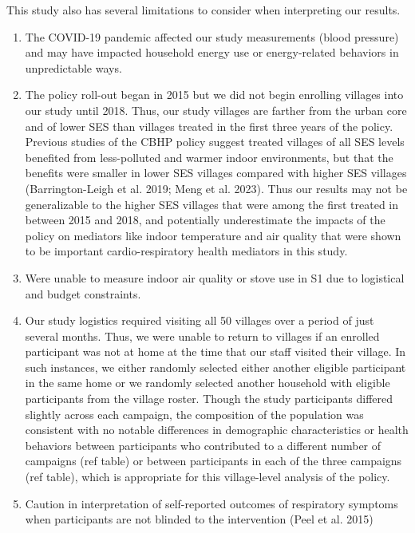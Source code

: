 \documentclass[
  letterpaper,
  DIV=11,
  numbers=noendperiod]{scrartcl}
\providecommand{\tightlist}{%
  \setlength{\itemsep}{0pt}\setlength{\parskip}{0pt}}\usepackage{longtable,booktabs,array}
\begin{document}
This study also has several limitations to consider when interpreting
our results.

\begin{enumerate}
\def\labelenumi{\arabic{enumi})}
\tightlist
\item
  The COVID-19 pandemic affected our study measurements (blood pressure)
  and may have impacted household energy use or energy-related behaviors
  in unpredictable ways.
\item
  The policy roll-out began in 2015 but we did not begin enrolling
  villages into our study until 2018. Thus, our study villages are
  farther from the urban core and of lower SES than villages treated in
  the first three years of the policy. Previous studies of the CBHP
  policy suggest treated villages of all SES levels benefited from
  less-polluted and warmer indoor environments, but that the benefits
  were smaller in lower SES villages compared with higher SES villages
  (Barrington-Leigh et al. 2019; Meng et al. 2023). Thus our results may
  not be generalizable to the higher SES villages that were among the
  first treated in between 2015 and 2018, and potentially underestimate
  the impacts of the policy on mediators like indoor temperature and air
  quality that were shown to be important cardio-respiratory health
  mediators in this study.
\item
  Were unable to measure indoor air quality or stove use in S1 due to
  logistical and budget constraints.\\
\item
  Our study logistics required visiting all 50 villages over a period of
  just several months. Thus, we were unable to return to villages if an
  enrolled participant was not at home at the time that our staff
  visited their village. In such instances, we either randomly selected
  either another eligible participant in the same home or we randomly
  selected another household with eligible participants from the village
  roster. Though the study participants differed slightly across each
  campaign, the composition of the population was consistent with no
  notable differences in demographic characteristics or health behaviors
  between participants who contributed to a different number of
  campaigns (ref table) or between participants in each of the three
  campaigns (ref table), which is appropriate for this village-level
  analysis of the policy.
\item
  Caution in interpretation of self-reported outcomes of respiratory
  symptoms when participants are not blinded to the intervention (Peel
  et al. 2015)
\end{enumerate}
\end{document}
